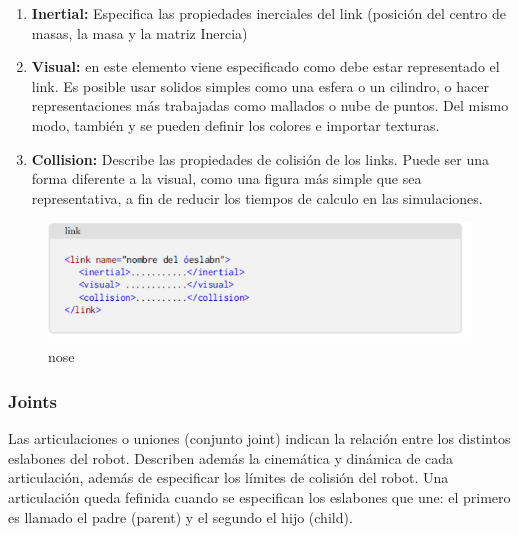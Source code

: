         \begin{enumerate}
            \item \textbf{Inertial:} Especifica las propiedades inerciales del link (posición del centro de masas, la masa y la matriz Inercia)
            \item \textbf{Visual:} en este elemento viene especificado como debe estar representado el link. Es posible usar solidos simples como una esfera o un cilindro, o hacer representaciones más trabajadas como mallados o nube de puntos. Del mismo modo, también y se pueden definir los colores e importar texturas.
            \item \textbf{Collision:} Describe las propiedades de colisión de los links. Puede ser una forma diferente a la visual, como una figura más simple que sea representativa, a fin de reducir los tiempos de calculo en las simulaciones.
        \end{enumerate}
        
        \begin{figure}[htb]
            \centering
            \includegraphics[width=0.8\linewidth]{Main/Chapter3/Images3/3-7/codigo.png}
            \caption{nose}
            \label{f:Cap3-7_nose_nose}
        \end{figure} 
        
        \subsubsection{Joints}
        
        Las articulaciones o uniones (conjunto joint) indican la relación entre los distintos eslabones del robot. Describen además la cinemática y dinámica de cada articulación, además de especificar los límites de colisión del robot. Una articulación queda fefinida cuando se especifican los eslabones que une: el primero es llamado el padre (parent) y el segundo el hijo (child).
        
